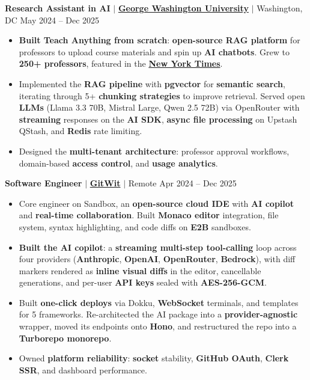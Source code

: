 \documentclass[10pt,a4paper]{article}
\begin{document}
\vspace{1pt}
\textbf{Research Assistant in AI} $|$ \textbf{\href{https://gwdhi.org/student-spotlight-akhilesh-rangani/}{George Washington University}} $|$ Washington, DC \hfill May 2024 -- Dec 2025
\begin{itemize}
    \item \textbf{Built Teach Anything from scratch}: \textbf{open-source RAG platform} for professors to upload course materials and spin up \textbf{AI chatbots}. Grew to \textbf{250+ professors}, featured in the \textbf{\href{https://www.nytimes.com/2026/01/17/nyregion/ai-college-classes.html}{New York Times}}.
    \item Implemented the \textbf{RAG pipeline} with \textbf{pgvector} for \textbf{semantic search}, iterating through 5+ \textbf{chunking strategies} to improve retrieval. Served open \textbf{LLMs} (Llama 3.3 70B, Mistral Large, Qwen 2.5 72B) via OpenRouter with \textbf{streaming} responses on the \textbf{AI SDK}, \textbf{async file processing} on Upstash QStash, and \textbf{Redis} rate limiting.
    \item Designed the \textbf{multi-tenant architecture}: professor approval workflows, domain-based \textbf{access control}, and \textbf{usage analytics}.
\end{itemize}

\vspace{1pt}
\textbf{Software Engineer} $|$ \textbf{\href{https://gitwit.dev}{GitWit}} $|$ Remote \hfill Apr 2024 -- Dec 2025
\begin{itemize}
    \item Core engineer on Sandbox, an \textbf{open-source cloud IDE} with \textbf{AI copilot} and \textbf{real-time collaboration}. Built \textbf{Monaco editor} integration, file system, syntax highlighting, and code diffs on \textbf{E2B} sandboxes.
    \item \textbf{Built the AI copilot}: a \textbf{streaming multi-step tool-calling} loop across four providers (\textbf{Anthropic}, \textbf{OpenAI}, \textbf{OpenRouter}, \textbf{Bedrock}), with diff markers rendered as \textbf{inline visual diffs} in the editor, cancellable generations, and per-user \textbf{API keys} sealed with \textbf{AES-256-GCM}.
    \item Built \textbf{one-click deploys} via Dokku, \textbf{WebSocket} terminals, and templates for 5 frameworks. Re-architected the AI package into a \textbf{provider-agnostic} wrapper, moved its endpoints onto \textbf{Hono}, and restructured the repo into a \textbf{Turborepo monorepo}.
    \item Owned \textbf{platform reliability}: \textbf{socket} stability, \textbf{GitHub OAuth}, \textbf{Clerk SSR}, and dashboard performance.
\end{itemize}
\end{document}
